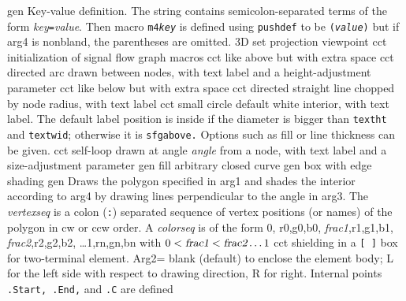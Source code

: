   {gen}
  {Key-value definition. The string contains semicolon-separated
  terms
   of the form {\sl key}{\tt =}{\sl value}.  Then macro {\tt m4{\sl key}}
   is defined using {\tt pushdef} to be {\tt ({\sl value})} but if arg4
   is nonbland, the parentheses are omitted.}
  {3D} {set projection viewpoint}
 {cct}
  {initialization of signal
  flow graph macros}
  {cct}
  {like above but with extra space}
  {cct}
  {directed arc drawn between nodes, with text label
    and a height-adjustment parameter }
  {cct}
  {like below but with extra space}
  {cct}
  {directed straight line chopped by node radius, with text label}
  {cct}
  {small circle default white interior, with text label. The default
  label position is inside if the diameter is bigger than {\tt textht}
  and {\tt textwid}; otherwise it is {\tt sfgabove.} Options such as
  fill or line thickness can be given.}
  {cct}
  {self-loop drawn at angle {\sl angle} from a node,
     with text label and a size-adjustment parameter }
  {gen}
  {fill arbitrary closed curve}
  {gen}
  {box with edge shading}
 {gen}
  {Draws the polygon specified in arg1 and
  shades the interior according
   to arg4 by drawing lines perpendicular to the angle in arg3.  The {\sl
   vertexseq} is a colon ({\tt:}) separated sequence of vertex positions
   (or names) of the polygon in cw or ccw order. A {\sl colorseq} is of
   the form 0, r0,g0,b0, {\sl frac1},r1,g1,b1, {\sl frac2},r2,g2,b2,
   \ldots 1,rn,gn,bn with $0 < \hbox{\sl frac1} < \hbox{\sl frac2}
   \ldots 1$
}  {cct}
  {shielding in a {\tt [ ]} box for
  two-terminal element. Arg2= blank
    (default) to enclose the element body; L for the left side with
    respect to drawing direction, R for right. Internal points {\tt
    .Start, .End,} and {\tt .C} are defined}
